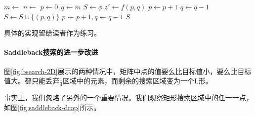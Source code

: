 \documentclass[UTF8]{article}
\begin{document}
\begin{algorithmic}[1]
  \State $m \gets$ 
  \State $n \gets$ 
  \State $p \gets 0, q \gets m$
  \State $S \gets \phi$
    \State $z' \gets f(p, q)$
      \State $p \gets p + 1$
      \State $q \gets q - 1$
    \Else
      \State $S \gets S \cup \{(p, q)\}$
      \State $p \gets p + 1, q \gets q - 1$
    \EndIf
  \EndWhile
  \State \Return $S$
\EndFunction
\end{algorithmic}

具体的实现留给读者作为练习。

\paragraph{Saddleback搜索的进一步改进}

图\ref{fig:bsearch-2D}展示的两种情况中，矩阵中点的值要么比目标值小，要么比目标值大。都只能丢弃$\frac{1}{4}$区域中的元素，而剩余的搜索区域变为一个L形。

事实上，我们忽略了另外的一个重要情况。我们观察矩形搜索区域中的任一一点，如图\ref{fig:saddleback-drop}所示。
\end{document}
